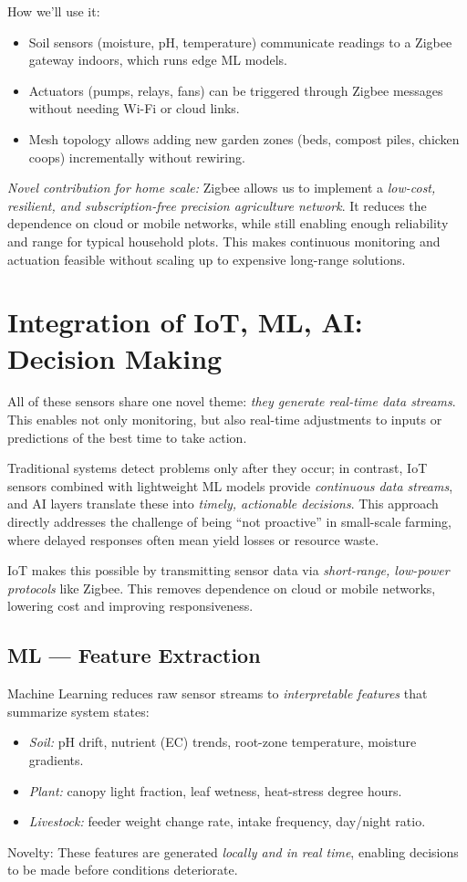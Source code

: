 \documentclass{sigchi}
\begin{document}
How we’ll use it:
\begin{itemize}
	\item Soil sensors (moisture, pH, temperature) communicate readings to a Zigbee gateway indoors, which runs edge ML models.
	\item Actuators (pumps, relays, fans) can be triggered through Zigbee messages without needing Wi-Fi or cloud links.
	\item Mesh topology allows adding new garden zones (beds, compost piles, chicken coops) incrementally without rewiring.
\end{itemize}

\emph{Novel contribution for home scale:} Zigbee allows us to implement a \emph{low-cost, resilient, and subscription-free precision agriculture network}. It reduces the dependence on cloud or mobile networks, while still enabling enough reliability and range for typical household plots. This makes continuous monitoring and actuation feasible without scaling up to expensive long-range solutions.

\section{Integration of IoT, ML, AI: Decision Making}

All of these sensors share one novel theme: \emph{they generate real-time data streams}. This enables not only monitoring, but also real-time adjustments to inputs or predictions of the best time to take action.

Traditional systems detect problems only after they occur; in contrast, IoT sensors combined with lightweight ML models provide \emph{continuous data streams}, and AI layers translate these into \emph{timely, actionable decisions}. This approach directly addresses the challenge of being “not proactive” in small-scale farming, where delayed responses often mean yield losses or resource waste.

IoT makes this possible by transmitting sensor data via \emph{short-range, low-power protocols} like Zigbee. This removes dependence on cloud or mobile networks, lowering cost and improving responsiveness.

\subsection{ML — Feature Extraction}

Machine Learning reduces raw sensor streams to \emph{interpretable features} that summarize system states:
\begin{itemize}
	\item \emph{Soil:} pH drift, nutrient (EC) trends, root-zone temperature, moisture gradients.
	\item \emph{Plant:} canopy light fraction, leaf wetness, heat-stress degree hours.
	\item \emph{Livestock:} feeder weight change rate, intake frequency, day/night ratio.
\end{itemize}
Novelty: These features are generated \emph{locally and in real time}, enabling decisions to be made before conditions deteriorate.
\end{document}
